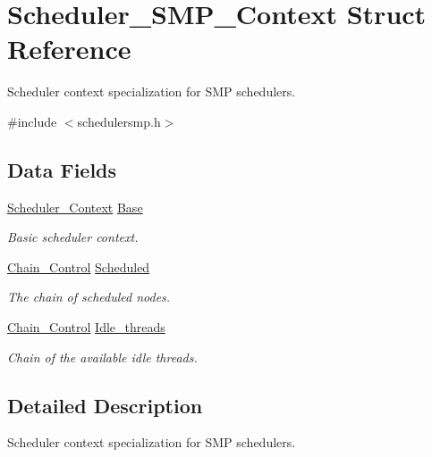 \hypertarget{structScheduler__SMP__Context}{}\section{Scheduler\+\_\+\+S\+M\+P\+\_\+\+Context Struct Reference}
\label{structScheduler__SMP__Context}


Scheduler context specialization for S\+MP schedulers.  




{\ttfamily \#include $<$schedulersmp.\+h$>$}

\subsection*{Data Fields}
\begin{DoxyCompactItemize}
\item 
\mbox{\label{structScheduler__SMP__Context_a16f2330a085bc961e8f73e4341860714}} 
\mbox{\hyperlink{structScheduler__Context}{Scheduler\+\_\+\+Context}} \mbox{\hyperlink{structScheduler__SMP__Context_a16f2330a085bc961e8f73e4341860714}{Base}}
\begin{DoxyCompactList}\small\item\em Basic scheduler context. \end{DoxyCompactList}\item 
\mbox{\label{structScheduler__SMP__Context_a118bd4fcef5e5b04e8a942b77d08941f}} 
\mbox{\hyperlink{unionChain__Control}{Chain\+\_\+\+Control}} \mbox{\hyperlink{structScheduler__SMP__Context_a118bd4fcef5e5b04e8a942b77d08941f}{Scheduled}}
\begin{DoxyCompactList}\small\item\em The chain of scheduled nodes. \end{DoxyCompactList}\item 
\mbox{\hyperlink{unionChain__Control}{Chain\+\_\+\+Control}} \mbox{\hyperlink{structScheduler__SMP__Context_aad00b8bfe7c6cdd61f3e78f6da12acf6}{Idle\+\_\+threads}}
\begin{DoxyCompactList}\small\item\em Chain of the available idle threads. \end{DoxyCompactList}\end{DoxyCompactItemize}


\subsection{Detailed Description}
Scheduler context specialization for S\+MP schedulers. 

